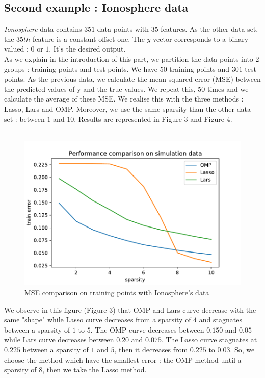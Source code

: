 \documentclass{article}
\begin{document}
\subsection{Second example : Ionosphere data}
\textit{Ionosphere} data contains $351$ data points with $35$ features. As the other data set, the $35th$ feature is a constant offset one. The $y$ vector corresponds to a binary valued : $0$ or $1$. It's the desired output.\\
As we explain in the introduction of this part, we partition the data points into $2$ groups : training points and test points. We have $50$ training points and $301$ test points. As the previous data, we calculate the mean squared error (MSE) between the predicted values of y and the true values. We repeat this, $50$ times and we calculate the average of these MSE. We realise this with the three methods : Lasso, Lars and OMP. Moreover, we use the same sparsity than the other data set : between $1$ and $10$. Results are represented in Figure $3$ and Figure $4$.\\
\\
\begin{figure}[!ht]
    \centering
    \includegraphics[scale=0.5]{./images/training_error_ionosphere.pdf}
    \caption{MSE comparison on training points with Ionosphere's data}
    \label{Figure 3}
\end{figure}
We observe in this figure (Figure $3$) that OMP and Lars curve decrease with the same "shape" while Lasso curve decreases from a sparsity of $4$ and stagnates between a sparsity of $1$ to $5$. The OMP curve decreases between $0.150$ and $0.05$ while Lars curve decreases between $0.20$ and $0.075$. The Lasso curve stagnates at $0.225$ between a sparsity of $1$ and $5$, then it decreases from $0.225$ to $0.03$. So, we choose the method which have the smallest error : the OMP method until a sparsity of $8$, then we take the Lasso method.\\
\end{document}
